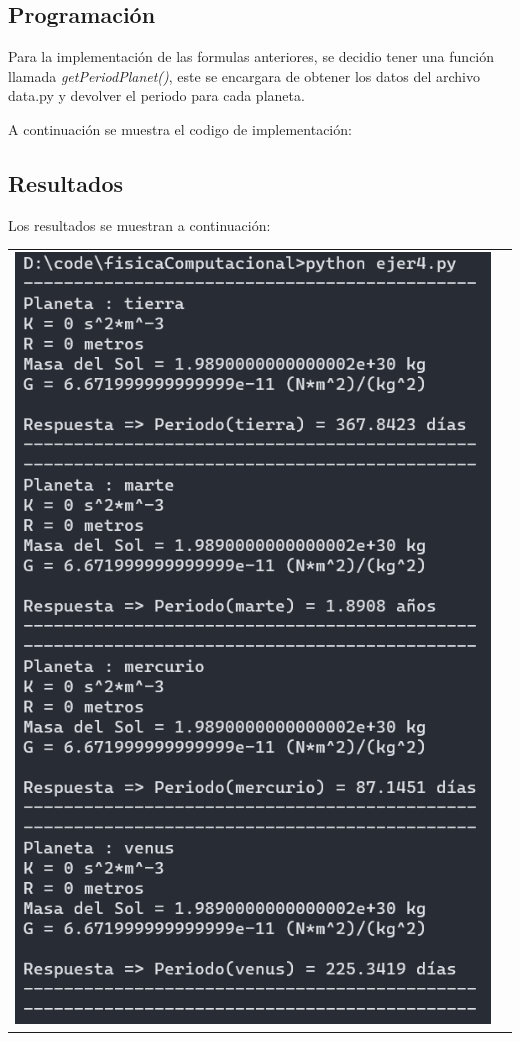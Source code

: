 \documentclass[a4paper,12pt]{article}
\begin{document}
    \subsection{Programación}
    Para la implementación de las formulas anteriores, se decidio tener una función llamada 
    \emph{getPeriodPlanet()}, este se encargara de obtener los datos del archivo data.py y devolver
    el periodo para cada planeta.

    A continuación se muestra el codigo de implementación:
        
    \subsection{Resultados}
    Los resultados se muestran a continuación:
    \begin{table}[htbp]
        \centering
        \begin{tabular}{cc}
            \begin{minipage}{.3\textwidth}
                \includegraphics[width=\linewidth]{e4_1}

\end{minipage}
\end{tabular}
\end{table}
\end{document}
